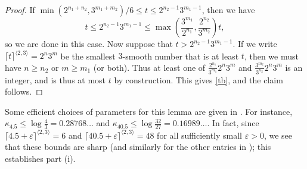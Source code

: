 \documentclass[10pt,a4paper,reqno]{amsart}
\numberwithin{equation}{section}
\theoremstyle{plain}
\theoremstyle{definition}
\newcommand\eps{\varepsilon}
\begin{document}
\begin{proof}  If $\min( 2^{n_1+n_2},3^{m_1+m_2})/6 \leq t \leq 2^{n_2-1} 3^{m_1-1}$, then we have
\begin{equation}\label{tb} 
  t \leq 2^{n_2-1} 3^{m_1-1} \leq \max\left(\frac{3^{m_1}}{2^{n_1}}, \frac{2^{n_2}}{3^{m_2}}\right) t,
\end{equation}
so we are done in this case.  Now suppose that $t > 2^{n_2-1} 3^{m_1-1}$.
If we write $\lceil t \rceil^{\langle 2,3 \rangle} =2^n 3^m$ be the smallest $3$-smooth number that is at least $t$, then we must have $n \geq n_2$ or $m \geq m_1$ (or both).  Thus at least one of $\frac{2^{n_1}}{3^{m_1}} 2^n 3^m$ and $\frac{3^{m_2}}{3^{n_2}} 2^n 3^m$ is an integer, and is thus at most $t$ by construction.  This gives \eqref{tb}, and the claim follows.
\end{proof}

Some efficient choices of parameters for this lemma are given in .  For instance, $\kappa_{4.5} \leq \log\frac{4}{3} = 0.28768\dots$ and $\kappa_{40.5} \leq \log \frac{32}{27} = 0.16989\dots$.  In fact, since $\lceil 4.5+\eps \rceil^{\langle 2,3\rangle} = 6$ and $\lceil 40.5+\eps \rceil^{\langle 2,3\rangle} = 48$ for all sufficiently small $\eps>0$, we see that these bounds are sharp (and similarly for the other entries in ); this establishes part (i).
\end{document}
